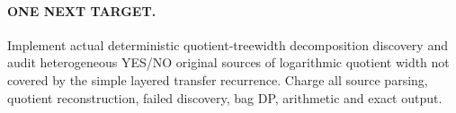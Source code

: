 \documentclass[11pt]{article}
\begin{document}
\paragraph{ONE NEXT TARGET.}
Implement actual deterministic quotient-treewidth decomposition discovery and audit heterogeneous YES/NO original sources of logarithmic quotient width not covered by the simple layered transfer recurrence. Charge all source parsing, quotient reconstruction, failed discovery, bag DP, arithmetic and exact output.
\end{document}
